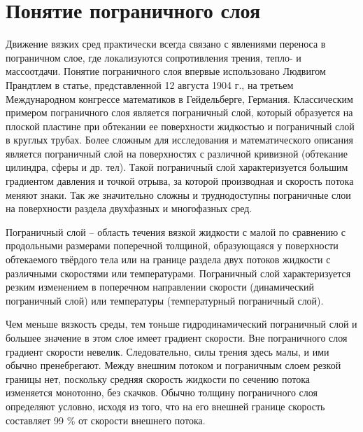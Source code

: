 \section{Понятие пограничного слоя}
	Движение вязких сред практически всегда связано с явлениями переноса в пограничном слое, где локализуются сопротивления трения, тепло- и массоотдачи. Понятие пограничного слоя впервые использовано Людвигом Прандтлем в статье, представленной 12 августа 1904 г., на третьем Международном конгрессе математиков в Гейдельберге, Германия. Классическим примером пограничного слоя является пограничный слой, который образуется на плоской пластине при обтекании ее поверхности жидкостью и пограничный слой в круглых трубах. Более сложным для исследования и математического описания является пограничный слой на поверхностях с различной кривизной (обтекание цилиндра, сферы и др. тел). Такой пограничный слой характеризуется большим градиентом давления и точкой отрыва, за которой производная и скорость потока меняют знаки. Так же значительно сложны и труднодоступны пограничные слои на поверхности раздела двухфазных и многофазных сред.
	
	Пограничный слой -- область течения вязкой жидкости с малой по сравнению с продольными размерами поперечной толщиной, образующаяся у поверхности обтекаемого твёрдого тела или на границе раздела двух потоков жидкости с различными скоростями или температурами. Пограничный слой характеризуется резким изменением в поперечном направлении скорости (динамический пограничный слой) или температуры (температурный пограничный слой).
	
	Чем меньше вязкость среды, тем тоньше гидродинамический пограничный слой и большее значение в этом слое имеет градиент скорости. Вне пограничного слоя градиент скорости невелик. Следовательно, силы трения здесь малы, и ими обычно пренебрегают. Между внешним потоком и пограничным слоем резкой границы нет, поскольку средняя скорость жидкости по сечению потока изменяется монотонно, без скачков. Обычно толщину пограничного слоя определяют условно, исходя из того, что на его внешней границе скорость составляет 99 \% от скорости внешнего потока.
	

